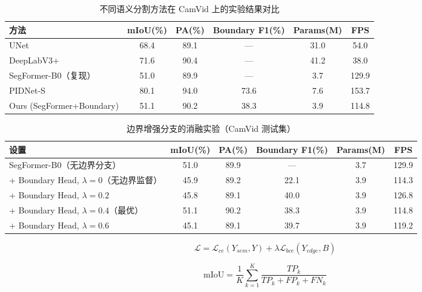 
\begin{table}[!htbp]
\centering
\caption{不同语义分割方法在 CamVid 上的实验结果对比}
\label{tab:main_compare}
\begin{tabular}{lccccc}
\toprule
方法 & mIoU(\%) & PA(\%) & Boundary F1(\%) & Params(M) & FPS \\
\midrule
UNet & 68.4 & 89.1 & — & 31.0 & 54.0 \\
DeepLabV3+ & 71.6 & 90.4 & — & 41.2 & 38.0 \\
SegFormer-B0（复现） & 51.0 & 89.9 & — & 3.7 & 129.9 \\
PIDNet-S & 80.1 & 94.0 & 73.6 & 7.6 & 153.7 \\
Ours (SegFormer+Boundary) & 51.1 & 90.2 & 38.3 & 3.9 & 114.8 \\
\bottomrule
\end{tabular}
\end{table}

\begin{table}[!htbp]
\centering
\caption{边界增强分支的消融实验（CamVid 测试集）}
\label{tab:ablation}
\begin{tabular}{lccccc}
\toprule
设置 & mIoU(\%) & PA(\%) & Boundary F1(\%) & Params(M) & FPS \\
\midrule
SegFormer-B0（无边界分支） & 51.0 & 89.9 & — & 3.7 & 129.9 \\
+ Boundary Head, $\lambda=0$（无边界监督） & 45.9 & 89.2 & 22.1 & 3.9 & 114.3 \\
+ Boundary Head, $\lambda=0.2$ & 45.8 & 89.1 & 40.0 & 3.9 & 126.8 \\
+ Boundary Head, $\lambda=0.4$（最优） & 51.1 & 90.2 & 38.3 & 3.9 & 114.8 \\
+ Boundary Head, $\lambda=0.6$ & 45.1 & 89.1 & 39.7 & 3.9 & 119.2 \\
\bottomrule
\end{tabular}
\end{table}

\begin{equation}
\mathcal{L} = \mathcal{L}_{ce}(Y_{sem}, Y) + \lambda \mathcal{L}_{bce}(Y_{edge}, B)
\label{eq:loss}
\end{equation}

\begin{equation}
\text{mIoU} = \frac{1}{K}\sum_{k=1}^{K}\frac{TP_k}{TP_k + FP_k + FN_k}
\label{eq:miou}
\end{equation}

